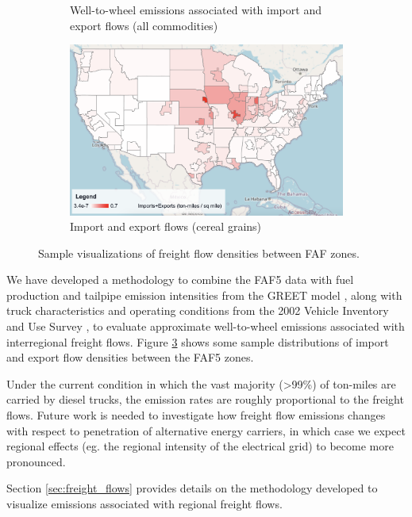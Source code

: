 \begin{figure}[ht]
\begin{subfigure}[b]{0.49\textwidth}
        \caption{Well-to-wheel emissions associated with import and export flows (all commodities)}
        \label{fig:import_export_emissions}
    \end{subfigure}
    \hfill
    \begin{subfigure}[b]{0.49\textwidth}
        \centering
        \includegraphics[width=\textwidth]{figures/imports_exports_cereal.png}
        \caption{Import and export flows (cereal grains)\newline}
        \label{fig:import_emissions}
    \end{subfigure}
    \caption{Sample visualizations of freight flow densities between FAF zones.}
    \label{fig:freight_flows}
\end{figure}

We have developed a methodology to combine the FAF5 data with fuel production and tailpipe emission intensities from the GREET model \cite{GREET_2022}, along with truck characteristics and operating conditions from the 2002 Vehicle Inventory and Use Survey \cite{VIUS_2002}, to evaluate approximate well-to-wheel emissions associated with interregional freight flows. Figure \ref{fig:freight_flows} shows some sample distributions of import and export flow densities between the FAF5 zones. 

Under the current condition in which the vast majority (>99\%) of ton-miles are carried by diesel trucks, the emission rates are roughly proportional to the freight flows. Future work is needed to investigate how freight flow emissions changes with respect to penetration of alternative energy carriers, in which case we expect regional effects (eg. the regional intensity of the electrical grid) to become more pronounced. 

Section \ref{sec:freight_flows} provides details on the methodology developed to visualize emissions associated with regional freight flows. 

